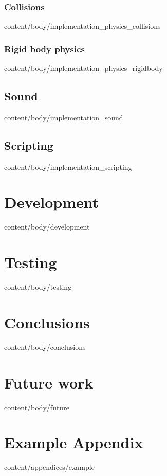 \documentclass[english, tfg, loc, lof, covers, printable, firstnumbered, epsbased]{tfgtfmthesisuam}
\begin{document}
    \subsection{Collisions}{content/body/implementation_physics_collisions}
    \subsection{Rigid body physics}{content/body/implementation_physics_rigidbody}
  \section{Sound}{content/body/implementation_sound}
  \section{Scripting}{content/body/implementation_scripting}

\chapter{Development}{content/body/development}

\chapter{Testing}{content/body/testing}

\chapter{Conclusions}{content/body/conclusions}

\chapter{Future work}{content/body/future}

\appendix

\chapter{Example Appendix}{content/appendices/example}
\end{document}
